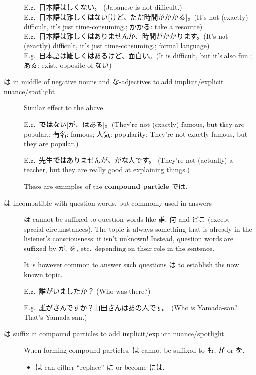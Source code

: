 \documentclass[../nihongo-gakushuu-kyouzai.tex]{subfiles}
\begin{document}
\begin{description}
    E.g.\ 日本語はしくない。 (Japanese is not difficult.) \\
    E.g.\ 日本語は難しく\textbf{は}ない[けど、ただ時間がかかる]。(It's not (exactly) difficult, it's just time-consuming.; かかる: take a resource) \\
    E.g.\ 日本語は難しく\textbf{は}ありませんか、時間がかかります。(It's not (exactly) difficult, it's just time-consuming.; formal language)\\
    E.g.\ 日本語は難しく\textbf{は}あるけど、面白い。(It is difficult, but it's also fun.; ある: exist, opposite of ない)
    \item[は in middle of negative nouns and な-adjectives to add implicit/explicit nuance/spotlight] Similar effect to the above.

    E.g.\ \textbf{では}ない[が、はある]。(They're not (exactly) famous, but they are popular.; 有名: famous; 人気: popularity; They're not exactly famous, but they are popular.)

    E.g.\ 先生\textbf{では}ありませんが、がな人です。 (They're not (actually) a teacher, but they are really good at explaining things.)


    These are examples of the \textbf{compound particle} では.
    \item[は incompatible with question words, but commonly used in answers] は cannot be suffixed to question words like 誰, 何 and どこ (except special circumstances). The topic is always something that is already in the listener's consciousness: it isn't unknown! Instead, question words are suffixed by が, を, etc.\ depending on their role in the sentence.

    It is however common to answer such questions は to establish the now known topic.

    E.g.\ 誰がいましたか？ (Who was there?)

    E.g.\ 誰がさんですか？山田さんはあの人です。 (Who is Yamada-san? That's Yamada-san.)
    \item[は suffix in compound particles to add implicit/explicit nuance/spotlight] When forming compound particles, は cannot be suffixed to も, が or を.
    \begin{itemize}
        \item は can either ``replace'' に or become には.


\end{itemize}
\end{description}
\end{document}
